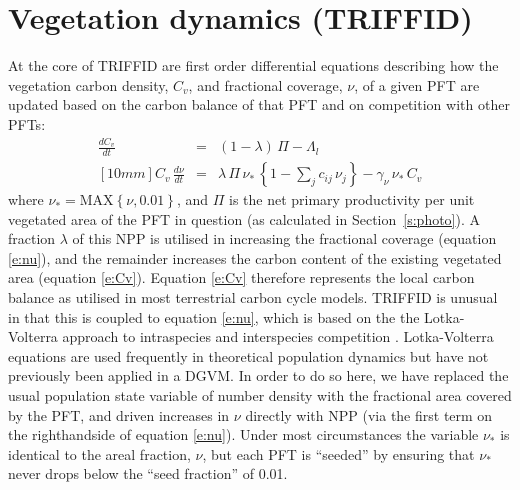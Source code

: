\documentclass[a4paper]{article}
\begin{document}
\section{Vegetation dynamics (TRIFFID)}\label{s:trif}
At the core of TRIFFID are first order differential equations
describing how the vegetation carbon density, $C_v$, and fractional
coverage, $\nu$, of a given PFT are updated based on the carbon
balance of that PFT and on competition with other PFTs:
\begin{eqnarray}
\frac{d C_{v}}{dt} &=& (1-\lambda) \, \Pi - \Lambda_{l} \label{e:Cv} \\ [10mm]
C_{v} \, \frac{d \nu}{dt} &=& \lambda \, \Pi \, \nu_{*} \,
\left\{1 - \sum_{j} c_{ij} \, \nu_j \right\}
-\gamma_{\nu} \, \nu_{*} \, C_{v} \label{e:nu}
\end{eqnarray}
\newline
where $\nu_{*}=\mbox{MAX} \left\{\nu,0.01 \right\}$, and $\Pi$ is the
net primary productivity per unit vegetated area of the PFT in
question (as calculated in Section~\ref{s:photo}).  A fraction $\lambda$
of this NPP is utilised in increasing the fractional coverage
(equation \eqref{e:nu}), and the remainder increases the carbon content
of the existing vegetated area (equation \eqref{e:Cv}).  Equation
\eqref{e:Cv} therefore represents the local carbon balance as utilised
in most terrestrial carbon cycle models. TRIFFID is unusual in that
this is coupled to equation \eqref{e:nu}, which is based on the the
Lotka-Volterra approach to intraspecies and interspecies competition
\citep[see for example ]{Sil87}.  Lotka-Volterra equations are used
frequently in theoretical population dynamics but have not previously
been applied in a DGVM. In order to do so here, we have replaced the
usual population state variable of number density with the fractional
area covered by the PFT, and driven increases in $\nu$ directly with
NPP (via the first term on the righthandside of equation
\eqref{e:nu}). Under most circumstances the variable $\nu_*$ is
identical to the areal fraction, $\nu$, but each PFT is ``seeded'' by
ensuring that $\nu_*$ never drops below the ``seed fraction'' of 0.01.
\end{document}
